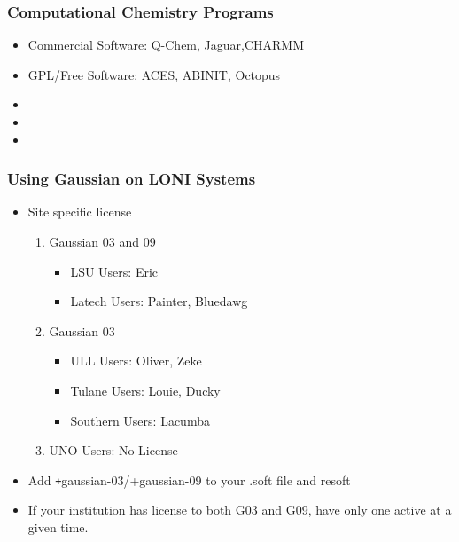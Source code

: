 \documentclass[slidestop,mathserif,compress,xcolor=svgnames]{beamer}
\begin{document}
\begin{frame}
\frametitle{\small Computational Chemistry Programs}
\begin{itemize}
 \item {\color{black}Commercial Software: Q-Chem, Jaguar,CHARMM}
 \item {\color{tigerspurple}GPL/Free Software: ACES, ABINIT, Octopus}
 \item {}
 \item {}
 \item {}
\end{itemize}
\end{frame}

\begin{frame}
\frametitle{\small Using Gaussian on LONI Systems}
\begin{itemize}
\item Site specific license%
\begin{enumerate}
 \item {\color{tigersblue}Gaussian 03 and 09}
\begin{itemize}
 \item {\color{tigersblue}LSU Users}: Eric
 \item {\color{tigersblue}Latech Users}: Painter, Bluedawg
\end{itemize}
 \item {\color{tigerspurple}Gaussian 03}
\begin{itemize}
 \item {\color{tigerspurple}ULL Users}: Oliver, Zeke
 \item {\color{tigerspurple}Tulane Users}: Louie, Ducky
 \item {\color{tigerspurple}Southern Users}: Lacumba
\end{itemize}
 \item UNO Users: No License
\end{enumerate}
\item Add {\texttt +gaussian-03/+gaussian-09} to your .soft file and resoft
\item \alert{If your institution has license to both G03 and G09, have only one active at a given time.}
\end{itemize}
\end{frame}
\end{document}
